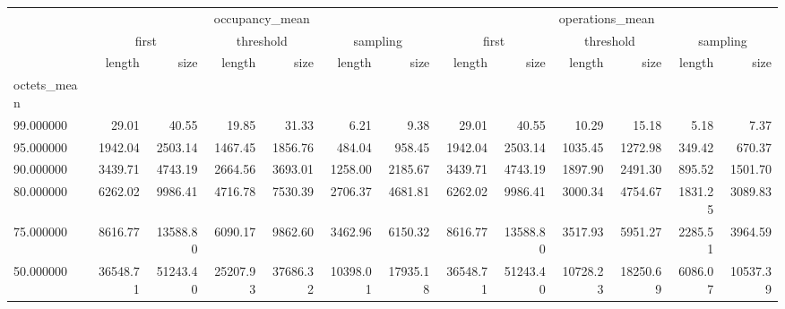 \begin{tabular}{lrrrrrrrrrrrr}
\toprule
 & \multicolumn{6}{c}{occupancy_mean} & \multicolumn{6}{c}{operations_mean} \\
 & \multicolumn{2}{c}{first} & \multicolumn{2}{c}{threshold} & \multicolumn{2}{c}{sampling} & \multicolumn{2}{c}{first} & \multicolumn{2}{c}{threshold} & \multicolumn{2}{c}{sampling} \\
 & length & size & length & size & length & size & length & size & length & size & length & size \\
octets_mean &  &  &  &  &  &  &  &  &  &  &  &  \\
\midrule
99.000000 & 29.01 & 40.55 & 19.85 & 31.33 & 6.21 & 9.38 & 29.01 & 40.55 & 10.29 & 15.18 & 5.18 & 7.37 \\
95.000000 & 1942.04 & 2503.14 & 1467.45 & 1856.76 & 484.04 & 958.45 & 1942.04 & 2503.14 & 1035.45 & 1272.98 & 349.42 & 670.37 \\
90.000000 & 3439.71 & 4743.19 & 2664.56 & 3693.01 & 1258.00 & 2185.67 & 3439.71 & 4743.19 & 1897.90 & 2491.30 & 895.52 & 1501.70 \\
80.000000 & 6262.02 & 9986.41 & 4716.78 & 7530.39 & 2706.37 & 4681.81 & 6262.02 & 9986.41 & 3000.34 & 4754.67 & 1831.25 & 3089.83 \\
75.000000 & 8616.77 & 13588.80 & 6090.17 & 9862.60 & 3462.96 & 6150.32 & 8616.77 & 13588.80 & 3517.93 & 5951.27 & 2285.51 & 3964.59 \\
50.000000 & 36548.71 & 51243.40 & 25207.93 & 37686.32 & 10398.01 & 17935.18 & 36548.71 & 51243.40 & 10728.23 & 18250.69 & 6086.07 & 10537.39 \\
\bottomrule
\end{tabular}
